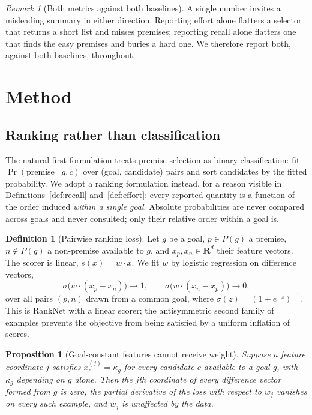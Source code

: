 \documentclass[11pt]{article}
\theoremstyle{plain}
\newtheorem{proposition}[theorem]{Proposition}
\theoremstyle{definition}
\newtheorem{definition}[theorem]{Definition}
\theoremstyle{remark}
\newtheorem{remark}[theorem]{Remark}
\begin{document}
\begin{remark}[Both metrics against both baselines]
A single number invites a misleading summary in either direction. Reporting
effort alone flatters a selector that returns a short list and misses premises;
reporting recall alone flatters one that finds the easy premises and buries a
hard one. We therefore report both, against both baselines, throughout.
\end{remark}

\section{Method}\label{sec:method}

\subsection{Ranking rather than classification}

The natural first formulation treats premise selection as binary
classification: fit $\Pr(\text{premise}\mid g,c)$ over (goal, candidate) pairs
and sort candidates by the fitted probability. We adopt a ranking formulation
instead, for a reason visible in Definitions~\ref{def:recall}
and~\ref{def:effort}: every reported quantity is a function of the order induced
\emph{within a single goal}. Absolute probabilities are never compared across
goals and never consulted; only their relative order within a goal is.

\begin{definition}[Pairwise ranking loss]\label{def:ranknet}
Let $g$ be a goal, $p\in P(g)$ a premise, $n\notin P(g)$ a non-premise available
to $g$, and $x_p,x_n\in\mathbf{R}^d$ their feature vectors. The scorer is linear,
$s(x)=w\cdot x$. We fit $w$ by logistic regression on difference vectors,
\[
\sigma\bigl(w\cdot(x_p-x_n)\bigr)\to 1,
\qquad
\sigma\bigl(w\cdot(x_n-x_p)\bigr)\to 0,
\]
over all pairs $(p,n)$ drawn from a common goal, where
$\sigma(z)=(1+e^{-z})^{-1}$. This is RankNet \cite{burges} with a linear
scorer; the antisymmetric second family of examples prevents the objective from
being satisfied by a uniform inflation of scores.
\end{definition}

\begin{proposition}[Goal-constant features cannot receive weight]\label{prop:cancel}
Suppose a feature coordinate $j$ satisfies $x_c^{(j)}=\kappa_g$ for every
candidate $c$ available to a goal $g$, with $\kappa_g$ depending on $g$ alone.
Then the $j$th coordinate of every difference vector formed from $g$ is zero, the
partial derivative of the loss with respect to $w_j$ vanishes on every such
example, and $w_j$ is unaffected by the data.
\end{proposition}
\end{document}
